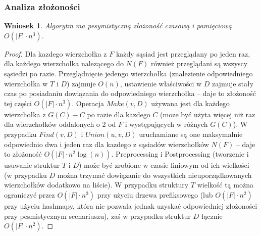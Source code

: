 \documentclass{pracamgr}
\newtheorem{corollary}[theorem]{Wniosek}
\begin{document}
    \subsubsection{Analiza złożoności}
    \begin{corollary}\label{zlozonosc lokalnej spojnosci}
     Algorytm ma pesymistyczną złożoność czasową i pamięciową $O(|F|\cdot n^3)$.
    \end{corollary}
    \begin{proof}
     Dla kazdego wierzchołka z $F$ każdy sąsiad jest przeglądany po jeden raz, dla każdego wierzchołka nalezącego do $N(F)$ również przeglądani są wszyscy sąsiedzi
     po razie. Przeglądnięcie jedengo wierzchołka (znalezienie odpowiedniego wierzchołka w $T$ i $D$) zajmuje $O(n)$,
     ustawienie właściwości w $D$ zajmuje stały czas po posiadaniu dowiązania do odpowiedniego wierzchołka -- daje to złożoność tej części $O(|F|\cdot n^3)$.\newline
     Operacja $Make(v,D)$ używana jest dla każdego wierzchołka z $G(C)-C$ po razie dla kazdego $C$
     (moze być użyta więcej niż raz dla wierzchołków oddalonych o 2 od $F$ i występujących w różnych $G(C)$).
     W przypadku $Find(v,D)$ i $Union(u,v,D)$ uruchamiane są one maksymalnie odpowiednio dwa i jeden raz dla kazdego z sąsiadów wierzchołków $N(F)$
     -- daje to złożoność $O(|F|\cdot n^2\log(n))$.\newline
     Preprocessing i Postprocessing (tworzenie i usuwanie struktur $T$ i $D$)
     może być zrobione w czasie liniowym od ich wielkości (w przypadku $D$ można trzymać dowiązanie do wszystkich nieuporządkowanych
     wierzchołków dodatkowo na liście). W przypadku struktury $T$ wielkość tą można ograniczyć przez $O(|F|\cdot n^3)$ przy użyciu drzewa prefiksowego
     (lub $O(|F|\cdot n^2)$ przy użyciu hashmapy, która nie pozwala jednak uzyskać odpowiedniej złożoności przy pesmistycznym scenariuszu),
     zaś w przypadku struktur $D$ łącznie $O(|F|\cdot n^2)$.
    \end{proof}
    
\end{document}
